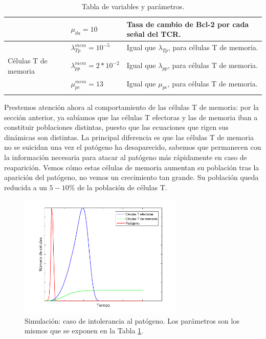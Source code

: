 \begin{table}[h]
\begin{center}
\begin{tabular}{>{\centering\arraybackslash}m{2cm} >{\arraybackslash}m{3cm} >{\arraybackslash}m{7cm} }
			& $\mu_{da} = 10$                 & Tasa de cambio de Bcl-2 por cada señal del TCR.           \\ \hline
			\multirow{4}{*}{} & $\lambda_{Tp}^{mem} = 10^{-5}$   & Igual que $\lambda_{Tp}$, para células T de memoria.      \\ \cline{2-3}
			Células T de memoria        & $\lambda_{pp}^{mem} = 2*10^{-2}$ & Igual que $\lambda_{pp}$, para células T de memoria.      \\ \cline{2-3}
			& $\mu_{pc}^{mem} = 13$           & Igual que $\mu_{pc}$, para células T de memoria.          \\ \cline{2-3}\hline
		\end{tabular}
		\caption{Tabla de variables y parámetros.}
		\label{tabla:param}
	\end{center}
\end{table}


Prestemos atención ahora al comportamiento de las células T de memoria: por la sección anterior, ya sabíamos que las células T efectoras y las de memoria iban a constituir poblaciones distintas, puesto que las ecuaciones que rigen sus dinámicas son distintas. La principal diferencia es que las células T de memoria no se suicidan una vez el patógeno ha desaparecido, sabemos que permanecen con la información necesaria para atacar al patógeno más rápidamente en caso de reaparición. Vemos cómo estas células de memoria aumentan su población tras la aparición del patógeno, no vemos un crecimiento tan grande. Su población queda reducida a un $5-10\%$ de la población de células T.


\begin{figure}[t]
	\centering
	\includegraphics[width=0.7\textwidth]{Imagenes/Simulaciones/intolerance}
	\caption{Simulación: caso de intolerancia al patógeno. Los parámetros son los mismos que se exponen en la Tabla \ref{tabla:param}.}
	\label{fig:intolerance}
\end{figure}

